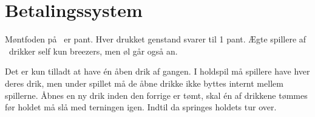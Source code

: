 \section{Betalingssystem}

Møntfoden på \LeClub\ er pant. Hver drukket genstand svarer til 1 pant. Ægte spillere af \LeClub\ drikker self kun breezers, men øl går også an.

Det er kun tilladt at have én åben drik af gangen. I holdspil må spillere have hver deres drik, men under spillet må de åbne drikke ikke byttes internt mellem spillerne. Åbnes en ny drik inden den forrige er tømt, skal én af drikkene tømmes før holdet må slå med terningen igen. Indtil da springes holdets tur over. 